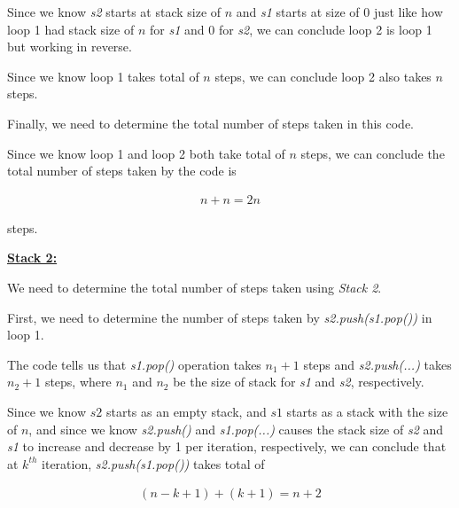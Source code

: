\documentclass[12pt]{article}
\begin{document}
\begin{enumerate}[a.]
\begin{mdframed}
    Since we know \textit{s2} starts at stack size of $n$ and \textit{s1} starts at size of 0
    just like how loop 1 had stack size of $n$ for \textit{s1} and
    0 for \textit{s2}, we can conclude loop 2 is loop 1 but working in reverse.

    \bigskip

    Since we know loop 1 takes total of $n$ steps, we can conclude loop 2
    also takes $n$ steps.
    \color{black}
    \bigskip

    Finally, we need to determine the total number of steps taken in this code.

    \bigskip

    Since we know \color{red}loop 1 and loop 2 both take total of $n$
    steps\color{black}, we can conclude the total number of steps taken by
    the code is

    \color{red}
    \begin{align}
        n + n = 2n
    \end{align}
    \color{black}

    steps.

    \bigskip

    \underline{\textbf{Stack 2:}}

    \bigskip

    We need to determine the total number of steps taken using \textit{Stack 2}.

    \bigskip

    First, we need to determine the number of steps taken by \textit{s2.push(s1.pop())} in loop 1.

    \bigskip

    The code tells us that \textit{s1.pop()} operation takes $n_1 + 1$ steps and
    \textit{s2.push(...)} takes $n_2 + 1$ steps, where $n_1$ and $n_2$
    be the size of stack for \textit{s1} and \textit{s2}, respectively.

    \bigskip

    Since we know $s2$ starts as an empty stack, and $s1$ starts as a stack
    with the size of $n$, and since we know \textit{s2.push()} and \textit{s1.pop(...)} causes the
    stack size of \textit{s2} and \textit{s1} to increase and decrease by 1 per iteration, respectively,
    we can conclude that at $k^{th}$ iteration, \textit{s2.push(s1.pop())}
    takes total of

    \setcounter{equation}{0}
    \begin{align}
        (n - k + 1) + (k + 1) = n + 2
    \end{align}


\end{mdframed}
\end{enumerate}
\end{document}
